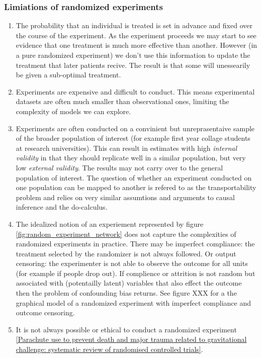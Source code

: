 \documentclass[11pt,a4paper,oneside]{book}
\begin{document}
\subsubsection*{Limiations of randomized experiments}
\label{subsec:limitations_of_experiment}
\begin{enumerate}

\item The probability that an individual is treated is set in advance and fixed over the course of the experiment. As the experiment proceeds we may start to see evidence that one treatment is much more effective than another. However (in a pure randomized experiment) we don't use this information to update the treatment that later patients recive. The result is that some will unessearily be given a sub-optimal treatment. 
\item Experiments are expensive and difficult to conduct. This means experimental datasets are often much smaller than observational ones, limiting the complexity of models we can explore.

\item Experiments are often conducted on a convinient but unreprasentaive sample of the broader population of interest (for example first year collage students at research universities). This can result in estimates with high \emph{internal validity} \citep{Campbell1963} in that they should replicate well in a similar population, but very low \emph{external validity}. The results may not carry over to the general population of interest. The question of whether an experiment conducted on one population can be mapped to another is refered to as the transportability problem \citep{Bareinboim2013}  and relies on very similar assumtions and arguments to causal inference and the do-calculus. 

\item The idealized notion of an experiement represented by figure \ref{fig:random_experiment_network} does not capture the complexities of randomized experiments in practice. There may be imperfect compliance: the treatment selected by the randomizer is not always followed. Or output censoring: the experimenter is not able to observe the outcome for all units (for example if people drop out). If complience or attrition is not random but associated with (potentailly latent) variables that also effect the outcome then the problem of confounding bias returns. See figure XXX for a the graphical model of a randomized experiment with imperfect compliance and outcome censoring. 

\item It is not always possible or ethical to conduct a randomized experiment \cite{parashutes} \ref{Parachute use to prevent death and major trauma related to gravitational challenge: systematic review of randomised controlled trials}. 
\end{enumerate}
\end{document}
